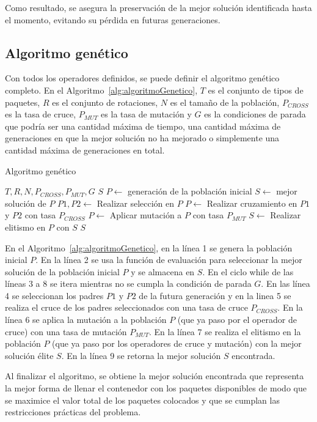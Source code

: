 Como resultado, se asegura la preservación de la mejor solución identificada hasta el momento, evitando su pérdida en futuras generaciones.

\subsection{Algoritmo genético}

Con todos los operadores definidos, se puede definir el algoritmo genético completo. En el Algoritmo~\ref{alg:algoritmoGenetico}, $T$ es el conjunto de tipos de paquetes, $R$ es el conjunto de rotaciones, $N$ es el tamaño de la población, $P_{CROSS}$ es la tasa de cruce, $P_{MUT}$ es la tasa de mutación y $G$ es la condiciones de parada que podría ser una cantidad máxima de tiempo, una cantidad máxima de generaciones en que la mejor solución no ha mejorado o simplemente una cantidad máxima de generaciones en total.

\begin{algorithm}[H]
    \caption{Algoritmo genético}\label{alg:algoritmoGenetico}
    \begin{algorithmic}[1]
        \Require $T, R, N, P_{CROSS}, P_{MUT}, G$
        \Ensure $S$
        \State $P \leftarrow$ generación de la población inicial
        \State $S \leftarrow$ mejor solución de $P$
        \State $P1,P2 \leftarrow$ Realizar selección en $P$
        \State $P \leftarrow$ Realizar cruzamiento en $P1$ y $P2$ con tasa $P_{CROSS}$
        \State $P \leftarrow$ Aplicar mutación a $P$ con tasa $P_{MUT}$
        \State $S \leftarrow$ Realizar elitismo en $P$ con $S$
        \EndWhile
        \State \Return $S$
    \end{algorithmic}
\end{algorithm}

En el Algoritmo~\ref{alg:algoritmoGenetico}, en la línea 1 se genera la población inicial $P$. En la línea 2 se usa la función de evaluación para seleccionar la mejor solución de la población inicial $P$ y se almacena en $S$. En el ciclo while de las líneas 3 a 8 se itera mientras no se cumpla la condición de parada $G$. En las línea 4 se seleccionan los padres $P1$ y $P2$ de la futura generación y en la linea 5 se realiza el cruce de los padres seleccionados con una tasa de cruce $P_{CROSS}$. En la línea 6 se aplica la mutación a la población $P$ (que ya paso por el operador de cruce) con una tasa de mutación $P_{MUT}$. En la línea 7 se realiza el elitismo en la población $P$ (que ya paso por los operadores de cruce y mutación) con la mejor solución élite $S$. En la línea 9 se retorna la mejor solución $S$ encontrada.

Al finalizar el algoritmo, se obtiene la mejor solución encontrada que representa la mejor forma de llenar el contenedor con los paquetes disponibles de modo que se maximice el valor total de los paquetes colocados y que se cumplan las restricciones prácticas del problema.